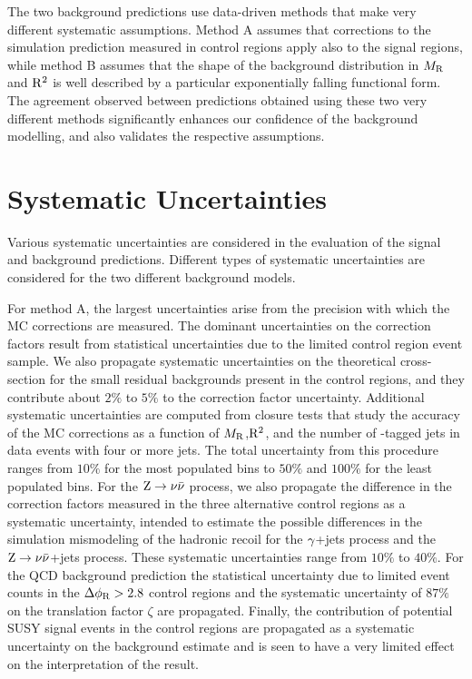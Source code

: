 The two background predictions use data-driven methods that make 
very different systematic assumptions. Method A assumes that corrections
to the simulation prediction measured in control regions apply also to the
signal regions, while method B assumes that the shape of the background distribution
in $M_\mathrm{R}$ and $\mathrm{R}^2$ is well described by a particular exponentially falling functional 
form. The agreement observed between predictions obtained using these two very different 
methods significantly enhances our confidence of the background modelling, and 
also validates the respective assumptions.

\section{Systematic Uncertainties}
Various systematic uncertainties are considered in the evaluation of the
signal and background predictions. Different types of systematic
uncertainties are considered for the two different background models.

For method A, the largest uncertainties arise from the precision with
which the MC corrections are measured. The dominant uncertainties
on the correction factors result from statistical uncertainties due to 
the limited control region event sample. We also propagate systematic
uncertainties on the theoretical cross-section for the small residual backgrounds 
present in the control regions, and they contribute about $2\%$ to $5\%$ to the 
correction factor uncertainty.
Additional systematic uncertainties are computed from closure tests that 
study the accuracy of the MC corrections as a function of 
$M_\mathrm{R}$,$\mathrm{R}^2$, and the number of \PQb-tagged jets in data events with four or more jets.
The total uncertainty from this procedure ranges from $10\%$ for the most populated bins to
$50\%$ and $100\%$ for the least populated bins. For the $\mathrm{Z}\rightarrow\nu\bar\nu$ process, we 
also propagate the difference in the correction factors measured in the three alternative 
control regions as a systematic uncertainty, intended to estimate the possible differences in 
the simulation mismodeling of the hadronic recoil for the $\gamma$+jets process and 
the $\mathrm{Z}\rightarrow\nu\bar\nu$+jets process. These systematic uncertainties 
range from $10\%$ to $40\%$. For the QCD background prediction the statistical uncertainty 
due to limited event counts in the $\Delta\phi_\mathrm{R}> 2.8$ control regions and the systematic
uncertainty of $87\%$ on the translation factor $\zeta$ are propagated.
Finally, the contribution of potential SUSY signal events in the control regions are
propagated as a systematic uncertainty on the background estimate 
and is seen to have a very limited effect on the interpretation of the result.

